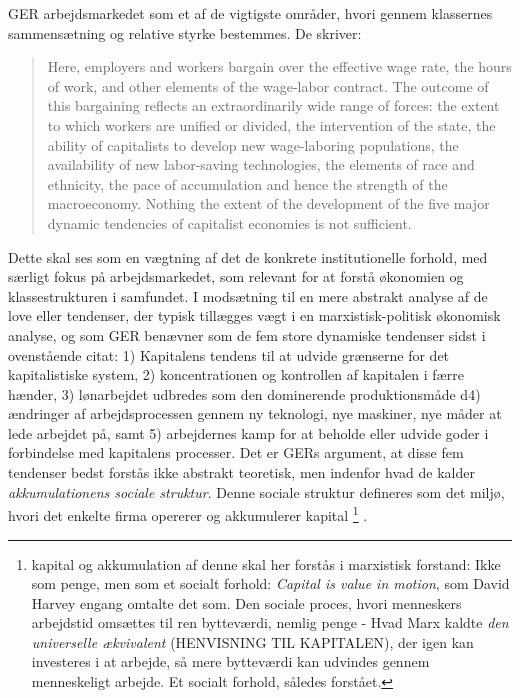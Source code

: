 GER arbejdsmarkedet som et af de vigtigste områder, hvori gennem klassernes sammensætning og relative styrke bestemmes. De skriver:
%
\begin{quote} \small %
Here, employers and workers bargain over the effective wage rate, the hours of work, and other elements of the wage-labor contract. The outcome of this bargaining reflects an extraordinarily wide range of forces: the extent to which workers are unified or divided, the intervention of the state, the ability of capitalists to develop new wage-laboring populations, the availability of new labor-saving technologies, the elements of race and ethnicity, the pace of accumulation and hence the strength of the macroeconomy. Nothing the extent of the development of the five major dynamic tendencies of capitalist economies is not sufficient. 
\end{quote}
%
Dette skal ses som en vægtning af det de konkrete institutionelle forhold, med særligt fokus på arbejdsmarkedet, som relevant for at forstå økonomien og klassestrukturen i samfundet. I modsætning til en mere abstrakt analyse af de love eller tendenser, der typisk tillægges vægt i en marxistisk-politisk økonomisk analyse, og som GER benævner som de fem store dynamiske tendenser sidst i ovenstående citat: \label{kapitalakkumulation} 1) Kapitalens tendens til at udvide grænserne for det kapitalistiske system, 2) koncentrationen og kontrollen af kapitalen i færre hænder, 3) lønarbejdet udbredes som den dominerende produktionsmåde d4) ændringer af arbejdsprocessen gennem ny teknologi, nye maskiner, nye måder at lede arbejdet på, samt  5) arbejdernes kamp for at beholde eller udvide goder i forbindelse med kapitalens processer. %
Det er GERs argument, at disse fem tendenser bedst forstås ikke abstrakt teoretisk, men indenfor hvad de kalder \emph{akkumulationens sociale struktur}. Denne sociale struktur defineres som det miljø, hvori det enkelte firma opererer og akkumulerer kapital%
%
\footnote{kapital og akkumulation af denne skal her forstås i marxistisk forstand: Ikke som penge, men som et socialt forhold: \emph{Capital is value in motion}, som David Harvey engang omtalte det som. Den sociale proces, hvori menneskers arbejdstid omsættes til ren bytteværdi, nemlig penge - Hvad Marx kaldte \emph{den universelle ækvivalent} (HENVISNING TIL KAPITALEN), der igen kan investeres i at arbejde, så mere bytteværdi kan udvindes gennem menneskeligt arbejde. Et socialt forhold, således forstået.}%
%
.

